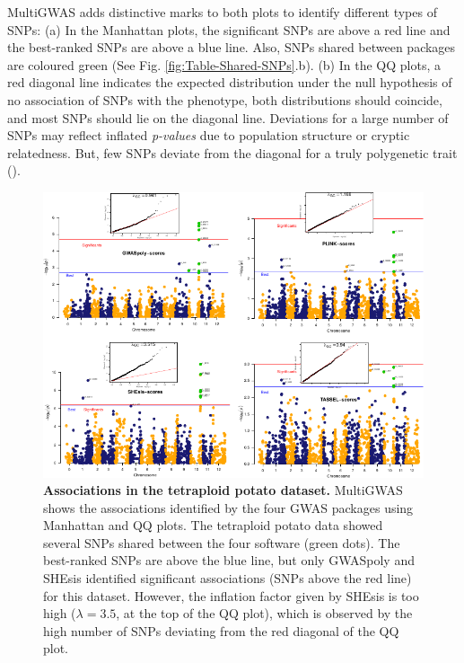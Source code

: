 \documentclass{article}
\begin{document}
MultiGWAS adds distinctive marks to both plots to identify different types of SNPs: (a) In the Manhattan plots, the significant SNPs are above a red line and the best-ranked SNPs are above a blue line. Also, SNPs shared between packages are coloured green (See Fig. \ref{fig:Table-Shared-SNPs}.b). (b) In the QQ plots, a red diagonal line indicates the expected distribution under the null hypothesis of no association of SNPs with the phenotype, both distributions should coincide, and most SNPs should lie on the diagonal line. Deviations for a large number of SNPs may reflect inflated {\emph{p-values }}due to population structure or cryptic relatedness. But, few SNPs deviate from the diagonal for a truly polygenetic trait (\cite{Power2016}).

\begin{figure}[H]
\begin{centering}
\includegraphics{images/paper-manhattan-QQ-plots}
\par\end{centering}
\caption{\textbf{{Associations in the tetraploid potato dataset.}} MultiGWAS shows the associations identified by the four GWAS packages using Manhattan and QQ plots. The tetraploid potato data showed several SNPs shared between the four software (green dots). The best-ranked SNPs are above the blue line, but only GWASpoly and SHEsis identified significant associations (SNPs above the red line) for this dataset. However, the inflation factor given by SHEsis is too high ($\lambda=3.5$, at the top of the QQ plot), which is observed by the high number of SNPs deviating from the red diagonal of the QQ plot. \label{fig:view-qqmanhattan}}
\end{figure}
\end{document}
